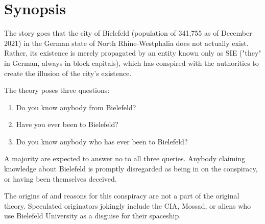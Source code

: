 \section{Synopsis}

The story goes that the city of Bielefeld (population of 341,755 as of December 2021) in the German state of North Rhine-Westphalia does not actually exist. Rather, its existence is merely propagated by an entity known only as SIE ("they" in German, always in block capitals), which has conspired with the authorities to create the illusion of the city's existence.

The theory poses three questions:

\begin{enumerate}
\item Do you know anybody from Bielefeld?
\item Have you ever been to Bielefeld?
\item Do you know anybody who has ever been to Bielefeld?
\end{enumerate}

A majority are expected to answer no to all three queries. Anybody claiming knowledge about Bielefeld is promptly disregarded as being in on the conspiracy, or having been themselves deceived.

The origins of and reasons for this conspiracy are not a part of the original theory. Speculated originators jokingly include the CIA, Mossad, or aliens who use Bielefeld University as a disguise for their spaceship.
